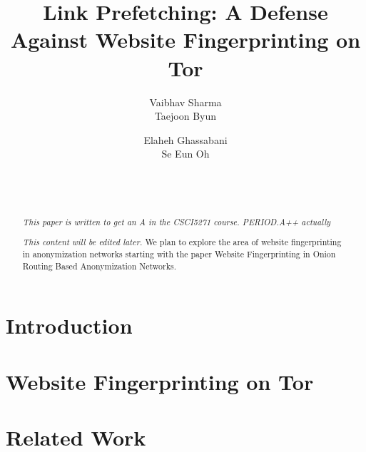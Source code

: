 \documentclass{sig-alternate-05-2015}
\begin{document}
\title{Link Prefetching: A Defense Against Website Fingerprinting on Tor }

\author{
    \alignauthor
        Vaibhav Sharma\\%
    \alignauthor
        Taejoon Byun\\
\and
    \alignauthor
        Elaheh Ghassabani\\
    \alignauthor
        Se Eun Oh\\%
\and
      \\
           \\
}

\maketitle
\begin{abstract}
\emph{This paper is written to get an A in the CSCI5271 course.
PERIOD.A++ actually}

\emph{This content will be edited later.} We plan to explore the area of website fingerprinting in anonymization networks starting with the paper Website Fingerprinting in Onion Routing Based Anonymization Networks.
\end{abstract}



\section{Introduction}


\section{Website Fingerprinting on Tor}
\label{sec2}


\section{Related Work}
\label{sec3}

\end{document}
